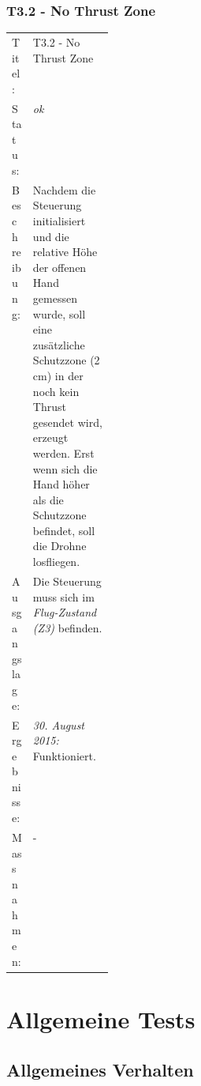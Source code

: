 \subsubsection{T3.2 - No Thrust Zone}
\begin{table}[H]
	\centering
	\small\renewcommand{\arraystretch}{1.4}
	\begin{tabularx}{0.9\textwidth}{ L{0.15\linewidth} | X  }%
		\hline
		Titel: & T3.2 - No Thrust Zone\\
		Status: & \textit{ok}\\
		Beschreibung: &  
		Nachdem die Steuerung initialisiert und die relative Höhe der offenen Hand gemessen wurde, soll eine zusätzliche Schutzzone (2\,cm) in der noch kein Thrust gesendet wird, erzeugt werden.
		Erst wenn sich die Hand höher als die Schutzzone befindet, soll die Drohne losfliegen.
		\\
		Ausgangslage: & Die Steuerung muss sich im \textit{Flug-Zustand (Z3)} befinden.\\
		Ergebnisse: & \textit{30. August 2015:}
		Funktioniert.
		\\
		Massnahmen: & -\\
		\hline
	\end{tabularx}
\end{table}




\newpage
\section{Allgemeine Tests}
\label{sec:generalTest}
\subsection{Allgemeines Verhalten}
